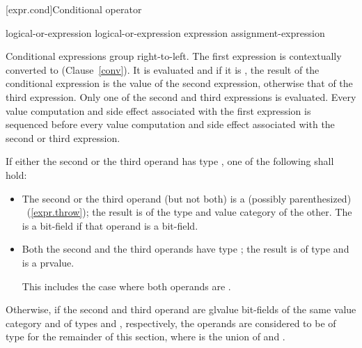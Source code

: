[expr.cond]{Conditional operator}%
%
%
%

\begin{bnf}
\br
    logical-or-expression\br
    logical-or-expression  expression \terminal{:} assignment-expression
\end{bnf}

\pnum
Conditional expressions group right-to-left. The first expression is
contextually converted to 
(Clause~\ref{conv}). It is
evaluated and if it is , the result of the conditional
expression is the value of the second expression, otherwise that of the
third expression. Only one of the second and third expressions is
evaluated. Every
%
value computation and side effect associated with the
first expression is sequenced before every value computation and side
effect associated with the second or third expression.

\pnum
If either the second or the third operand has type ,
one of the following shall hold:

\begin{itemize}
%
\item The second or the third operand (but not both) is a (possibly
parenthesized) ~(\ref{expr.throw}); the result
is of the type and value category of the other.
The 
is a bit-field if that operand is a bit-field.

\item Both the second and the third operands have type ; the
result is of type  and is a prvalue. \begin{note} This
includes the case where both operands are .
\end{note}
\end{itemize}

\pnum
Otherwise, if the second and third operand are glvalue bit-fields
of the same value category and
of types   and  , respectively,
the operands are considered to be of type  
for the remainder of this section,
where  is the union of  and .

